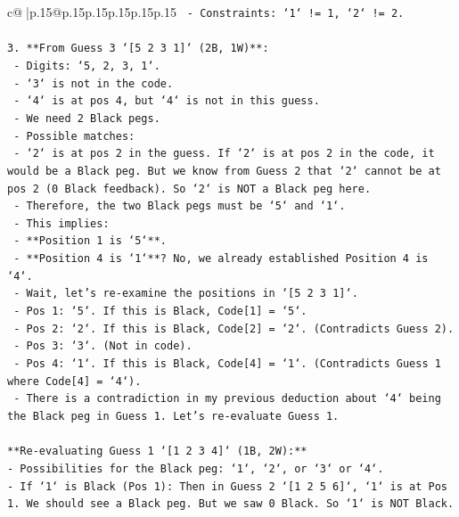 \documentclass{article}
\begin{document}
{\begin{supertabular}{c@{$\;$}|p{.15\linewidth}@{}p{.15\linewidth}p{.15\linewidth}p{.15\linewidth}p{.15\linewidth}p{.15\linewidth}}
{{{\texttt{    {-} Constraints: `1` != 1, `2` != 2.} \\
\\ 
\texttt{3.  **From Guess 3 `{[}5 2 3 1{]}` (2B, 1W)**:} \\
\texttt{    {-} Digits: `5, 2, 3, 1`.} \\
\texttt{    {-} `3` is not in the code.} \\
\texttt{    {-} `4` is at pos 4, but `4` is not in this guess.} \\
\texttt{    {-} We need 2 Black pegs.} \\
\texttt{    {-} Possible matches:} \\
\texttt{        {-} `2` is at pos 2 in the guess. If `2` is at pos 2 in the code, it would be a Black peg. But we know from Guess 2 that `2` cannot be at pos 2 (0 Black feedback). So `2` is NOT a Black peg here.} \\
\texttt{        {-} Therefore, the two Black pegs must be `5` and `1`.} \\
\texttt{        {-} This implies:} \\
\texttt{            {-} **Position 1 is `5`**.} \\
\texttt{            {-} **Position 4 is `1`**? No, we already established Position 4 is `4`.} \\
\texttt{            {-} Wait, let's re{-}examine the positions in `{[}5 2 3 1{]}`.} \\
\texttt{            {-} Pos 1: `5`. If this is Black, Code{[}1{]} = `5`.} \\
\texttt{            {-} Pos 2: `2`. If this is Black, Code{[}2{]} = `2`. (Contradicts Guess 2).} \\
\texttt{            {-} Pos 3: `3`. (Not in code).} \\
\texttt{            {-} Pos 4: `1`. If this is Black, Code{[}4{]} = `1`. (Contradicts Guess 1 where Code{[}4{]} = `4`).} \\
\texttt{    {-} There is a contradiction in my previous deduction about `4` being the Black peg in Guess 1. Let's re{-}evaluate Guess 1.} \\
\\ 
\texttt{**Re{-}evaluating Guess 1 `{[}1 2 3 4{]}` (1B, 2W):**} \\
\texttt{{-} Possibilities for the Black peg: `1`, `2`, or `3` or `4`.} \\
\texttt{{-} If `1` is Black (Pos 1): Then in Guess 2 `{[}1 2 5 6{]}`, `1` is at Pos 1. We should see a Black peg. But we saw 0 Black. So `1` is NOT Black.} \\
}}}
\end{supertabular}}
\end{document}
